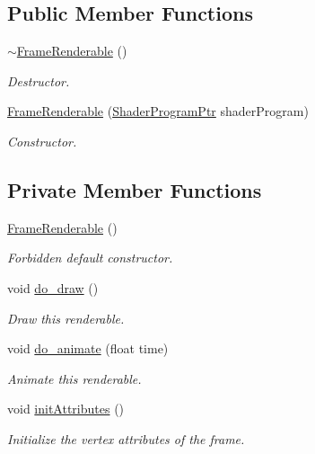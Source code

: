 \subsection*{Public Member Functions}
\begin{DoxyCompactItemize}
\item 
\hyperlink{classFrameRenderable_a823e77f15071737444f4bc7e589ca842}{$\sim$\+Frame\+Renderable} ()
\begin{DoxyCompactList}\small\item\em Destructor. \end{DoxyCompactList}\item 
\hyperlink{classFrameRenderable_a6d63f3eb741826c84fb49db9887efd3b}{Frame\+Renderable} (\hyperlink{ShaderProgram_8hpp_af8e4af1ad4c53875ee5d32ab7e1f4966}{Shader\+Program\+Ptr} shader\+Program)
\begin{DoxyCompactList}\small\item\em Constructor. \end{DoxyCompactList}\end{DoxyCompactItemize}
\subsection*{Private Member Functions}
\begin{DoxyCompactItemize}
\item 
\hyperlink{classFrameRenderable_a5984573fc1ac50ce3c0761f6e7ba78e1}{Frame\+Renderable} ()
\begin{DoxyCompactList}\small\item\em Forbidden default constructor. \end{DoxyCompactList}\item 
void \hyperlink{classFrameRenderable_aafa6b6444c8fa20a177eb562ba1a2672}{do\+\_\+draw} ()
\begin{DoxyCompactList}\small\item\em Draw this renderable. \end{DoxyCompactList}\item 
void \hyperlink{classFrameRenderable_a331b31de3a4988acf6304c30762d99cc}{do\+\_\+animate} (float time)
\begin{DoxyCompactList}\small\item\em Animate this renderable. \end{DoxyCompactList}\item 
void \hyperlink{classFrameRenderable_a39c514efa0139273930784ffec8329e9}{init\+Attributes} ()
\begin{DoxyCompactList}\small\item\em Initialize the vertex attributes of the frame. \end{DoxyCompactList}\end{DoxyCompactItemize}
